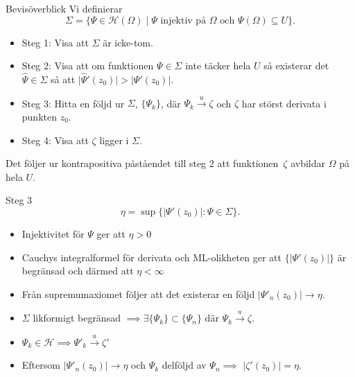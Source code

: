 \documentclass{beamer}
\renewcommand{\H}{\mathscr{H}}
\newcommand{\abs}[1]{\left\lvert #1 \right\rvert}
\begin{document}
\begin{frame}{Bevisöverblick}
Vi definierar
    \begin{equation*}
		\Sigma = \{ \Psi \in \H(\Omega) \mid \Psi \text{ injektiv på } \Omega \text{ och } \Psi(\Omega) \subseteq U\}.
    \end{equation*}
   \begin{itemize}
        \item[\(\boxtimes\)] Steg 1: Visa att $\Sigma$ är icke-tom.
        \item[\(\boxtimes\)] Steg 2: Visa att om funktionen $\Psi \in \Sigma$ inte täcker hela $U$ så existerar det $\hat{\Psi} \in \Sigma$ så att $\vert \hat{\Psi}'(z_0) \vert > \abs{\Psi'(z_0)}$.
        \item[\(\square\)] Steg 3: Hitta en följd ur $\Sigma$, $\{\Psi_k\}$, där  $\Psi_k \xrightarrow{u} \zeta$ och $\zeta$ har störst derivata i punkten $z_0$.
        \item[\(\square\)] Steg 4: Visa att $\zeta$ ligger i $\Sigma$.
    \end{itemize} 
    \vspace{0.3cm}
    Det följer ur kontrapositiva påståendet till steg 2 att funktionen~$\zeta$ avbildar $\Omega$ på hela $U$.
\end{frame}

\begin{frame}{Steg 3}
    \begin{equation*}
        \eta = \sup\{\abs{\Psi'(z_0)} : \Psi \in \Sigma\}.
    \end{equation*}
    \begin{itemize}
        \item Injektivitet för $\Psi$ ger att $\eta > 0$
        \item Cauchys integralformel för derivata och ML-olikheten ger att $\{\abs{\Psi'(z_0)}\}$ är begränsad och därmed att $\eta < \infty$
        \item Från supremumaxiomet följer att det existerar en följd $\abs{\Psi'_n(z_0)} \to \eta$.
            \vspace{1cm}
        \item $\Sigma$ likformigt begränsad $\implies \exists \{\Psi_k\} \subset \{\Psi_n\}$ där $\Psi_k \xrightarrow{u} \zeta$.
        \item $\Psi_k \in \H \implies \Psi'_k \xrightarrow{u} \zeta'$
        \item Eftersom $\abs{\Psi'_n(z_0)} \to \eta$ och $\Psi_k$ delföljd av $\Psi_n$$\implies$ $\abs{\zeta'(z_0)} = \eta$.
    \end{itemize}
\end{frame}
\end{document}
